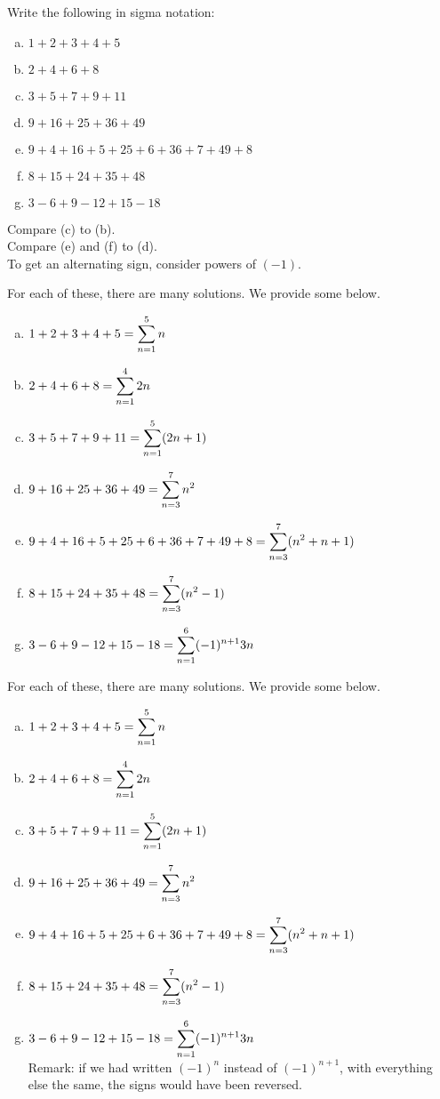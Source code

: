 \begin{Mquestion}
Write the following in sigma notation:
\begin{enumerate}[(a)]
\item $1+2+3+4+5$
\item $2+4+6+8$
\item $3+5+7+9+11$
\item $9+16+25+36+49$
\item $9+4+16+5+25+6+36+7+49+8$
\item $8+15+24+35+48$
\item $3-6+9-12+15-18$
\end{enumerate}
\end{Mquestion}
\begin{hint}
Compare (c) to (b).\\ Compare (e) and (f) to (d).\\ To get an alternating sign, consider  powers of $(-1)$.
\end{hint}
\begin{answer}
For each of these, there are many solutions. We provide some below.
\begin{enumerate}[(a)]
\item $1+2+3+4+5 = \displaystyle\sum_{n=1}^5n$
\item $2+4+6+8=\displaystyle\sum_{n=1}^42n$
\item $3+5+7+9+11=\displaystyle\sum_{n=1}^{5}(2n+1)$
\item $9+16+25+36+49=\displaystyle\sum_{n=3}^7 n^2$
\item $9+4+16+5+25+6+36+7+49+8=\displaystyle\sum_{n=3}^7 (n^2+n+1)$
\item $8+15+24+35+48= \displaystyle\sum_{n=3}^7 (n^2-1)$
\item $3-6+9-12+15-18=\displaystyle\sum_{n=1}^6 (-1)^{n+1}3n$
\end{enumerate}
\end{answer}
\begin{solution}
For each of these, there are many solutions. We provide some below.
\begin{enumerate}[(a)]
\item $1+2+3+4+5 = \displaystyle\sum_{n=1}^5n$
\item $2+4+6+8=\displaystyle\sum_{n=1}^4 2n$
\item $3+5+7+9+11=\displaystyle\sum_{n=1}^{5}(2n+1)$
\item $9+16+25+36+49=\displaystyle\sum_{n=3}^7 n^2$
\item $9+4+16+5+25+6+36+7+49+8=\displaystyle\sum_{n=3}^7 (n^2+n+1)$
\item $8+15+24+35+48= \displaystyle\sum_{n=3}^7 (n^2-1)$
\item $3-6+9-12+15-18=\displaystyle\sum_{n=1}^6 (-1)^{n+1}3n$ \\Remark: if we had written $(-1)^n$ instead of $(-1)^{n+1}$, with everything else the same, the signs would have been reversed.
\end{enumerate}

\end{solution}


